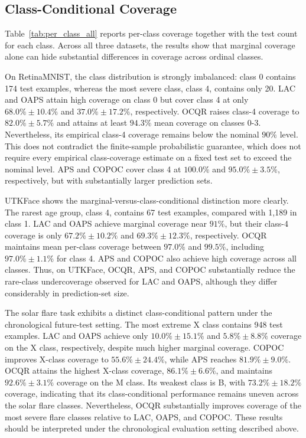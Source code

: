\documentclass[conference]{IEEEtran}
\begin{document}
\subsection{Class-Conditional Coverage}

Table~\ref{tab:per_class_all} reports per-class coverage together with the test count for each class. Across all three datasets, the results show that marginal coverage alone can hide substantial differences in coverage across ordinal classes.

On RetinaMNIST, the class distribution is strongly imbalanced: class 0 contains 174 test examples, whereas the most severe class, class 4, contains only 20. LAC and OAPS attain high coverage on class 0 but cover class 4 at only \(68.0\%\pm10.4\%\) and \(37.0\%\pm17.2\%\), respectively. OCQR raises class-4 coverage to \(82.0\%\pm5.7\%\) and attains at least \(94.3\%\) mean coverage on classes 0-3. Nevertheless, its empirical class-4 coverage remains below the nominal \(90\%\) level. This does not contradict the finite-sample probabilistic guarantee, which does not require every empirical class-coverage estimate on a fixed test set to exceed the nominal level. APS and COPOC cover class 4 at \(100.0\%\) and \(95.0\%\pm3.5\%\), respectively, but with substantially larger prediction sets.

UTKFace shows the marginal-versus-class-conditional distinction more clearly. The rarest age group, class 4, contains 67 test examples, compared with 1{,}189 in class 1. LAC and OAPS achieve marginal coverage near \(91\%\), but their class-4 coverage is only \(67.2\%\pm10.2\%\) and \(69.3\%\pm12.3\%\), respectively. OCQR maintains mean per-class coverage between \(97.0\%\) and \(99.5\%\), including \(97.0\%\pm1.1\%\) for class 4. APS and COPOC also achieve high coverage across all classes. Thus, on UTKFace, OCQR, APS, and COPOC substantially reduce the rare-class undercoverage observed for LAC and OAPS, although they differ considerably in prediction-set size.

The solar flare task exhibits a distinct class-conditional pattern under the chronological future-test setting. The most extreme X class contains 948 test examples. LAC and OAPS achieve only \(10.0\%\pm15.1\%\) and \(5.8\%\pm8.8\%\) coverage on the X class, respectively, despite much higher marginal coverage. COPOC improves X-class coverage to \(55.6\%\pm24.4\%\), while APS reaches \(81.9\%\pm9.0\%\). OCQR attains the highest X-class coverage, \(86.1\%\pm6.6\%\), and maintains \(92.6\%\pm3.1\%\) coverage on the M class. Its weakest class is B, with \(73.2\%\pm18.2\%\) coverage, indicating that its class-conditional performance remains uneven across the solar flare classes. Nevertheless, OCQR substantially improves coverage of the most severe flare classes relative to LAC, OAPS, and COPOC. These results should be interpreted under the chronological evaluation setting described above.
\end{document}
